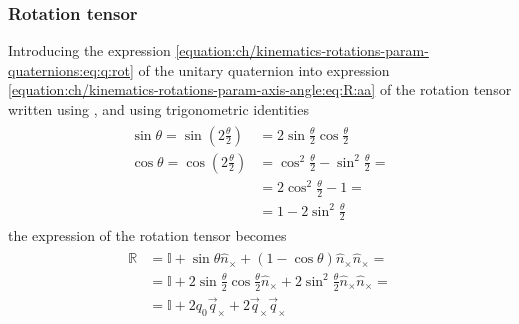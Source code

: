\documentclass[letterpaper,10pt,english]{jupyterBook}
\begin{document}
\subsubsection{Rotation tensor}
\label{\detokenize{ch/kinematics-rotations-param-quaternions:rotation-tensor}}\label{\detokenize{ch/kinematics-rotations-param-quaternions:classical-mechanics-kinematics-rotations-quaternions-rotation-tensor}}
\sphinxAtStartPar
Introducing the expression \eqref{equation:ch/kinematics-rotations-param-quaternions:eq:q:rot} of the unitary quaternion into expression \eqref{equation:ch/kinematics-rotations-param-axis-angle:eq:R:aa} of the rotation tensor written using {\hyperref[\detokenize{ch/kinematics-rotations-param-axis-angle:classical-mechanics-kinematics-rotations-axis-angle}]{}}, and using trigonometric identities
\begin{equation*}
\begin{split}\begin{aligned}
  \sin \theta = \sin \left( 2 \frac{\theta}{2} \right) & = 2 \sin \frac{\theta}{2} \cos \frac{\theta}{2} \\
  \cos \theta = \cos \left( 2 \frac{\theta}{2} \right) & =   \cos^2 \frac{\theta}{2} -   \sin^2 \frac{\theta}{2} = \\
                                                       & = 2 \cos^2 \frac{\theta}{2} - 1                         = \\
                                                       & = 1                         - 2 \sin^2 \frac{\theta}{2}
\end{aligned}\end{split}
\end{equation*}
\sphinxAtStartPar
the expression of the rotation tensor becomes
\begin{equation*}
\begin{split}\begin{aligned}
  \mathbb{R}
  & = \mathbb{I} + \sin \theta \hat{n}_\times + ( 1 - \cos \theta ) \hat{n}_{\times} \hat{n}_{\times} = \\
  & = \mathbb{I} + 2 \sin \frac{\theta}{2} \cos \frac{\theta}{2} \hat{n}_\times + 2 \sin^2 \frac{\theta}{2} \hat{n}_{\times} \hat{n}_{\times} = \\
  & = \mathbb{I} + 2 q_0 \vec{q}_\times + 2 \vec{q}_{\times} \vec{q}_{\times} \\
\end{aligned}\end{split}
\end{equation*}
\end{document}
